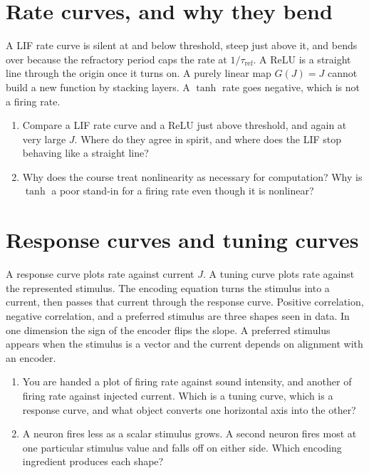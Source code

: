 \documentclass[11pt,letterpaper]{article}
\begin{document}
\section{Rate curves, and why they bend}

\begin{idea}
A LIF rate curve is silent at and below threshold, steep just above it, and bends over because the refractory period caps the rate at \(1/\tau_{\mathrm{ref}}\). A ReLU is a straight line through the origin once it turns on. A purely linear map \(G(J) = J\) cannot build a new function by stacking layers. A \(\tanh\) rate goes negative, which is not a firing rate.
\end{idea}

\begin{enumerate}
\item Compare a LIF rate curve and a ReLU just above threshold, and again at very large \(J\). Where do they agree in spirit, and where does the LIF stop behaving like a straight line?
\item Why does the course treat nonlinearity as necessary for computation? Why is \(\tanh\) a poor stand-in for a firing rate even though it is nonlinear?
\end{enumerate}

\section{Response curves and tuning curves}

\begin{idea}
A response curve plots rate against current \(J\). A tuning curve plots rate against the represented stimulus. The encoding equation turns the stimulus into a current, then passes that current through the response curve. Positive correlation, negative correlation, and a preferred stimulus are three shapes seen in data. In one dimension the sign of the encoder flips the slope. A preferred stimulus appears when the stimulus is a vector and the current depends on alignment with an encoder.
\end{idea}

\begin{enumerate}
\item You are handed a plot of firing rate against sound intensity, and another of firing rate against injected current. Which is a tuning curve, which is a response curve, and what object converts one horizontal axis into the other?
\item A neuron fires less as a scalar stimulus grows. A second neuron fires most at one particular stimulus value and falls off on either side. Which encoding ingredient produces each shape?
\end{enumerate}
\end{document}
